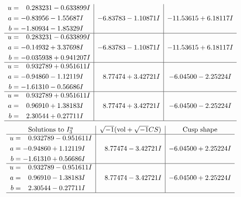 \documentclass[1p]{elsarticle_modified}
\theoremstyle{definition}
\newcommand{\I}{\sqrt{-1}}
\begin{document}
$$\begin{array}{c|c|c}
\begin{aligned}
u &= \phantom{-}0.283231 - 0.633899 I \\
a &= -0.83956 - 1.55687 I \\
b &= -1.80934 - 1.85329 I\end{aligned}
 & -6.83783 - 1.10871 I & -11.53615 + 6.18117 I \\ \hline\begin{aligned}
u &= \phantom{-}0.283231 - 0.633899 I \\
a &= -0.14932 + 3.37698 I \\
b &= -0.035938 + 0.941207 I\end{aligned}
 & -6.83783 - 1.10871 I & -11.53615 + 6.18117 I \\ \hline\begin{aligned}
u &= \phantom{-}0.932789 + 0.951611 I \\
a &= -0.94860 - 1.12119 I \\
b &= -1.61310 - 0.56686 I\end{aligned}
 & \phantom{-}8.77474 + 3.42721 I & -6.04500 - 2.25224 I \\ \hline\begin{aligned}
u &= \phantom{-}0.932789 + 0.951611 I \\
a &= \phantom{-}0.96910 + 1.38183 I \\
b &= \phantom{-}2.30544 + 0.27711 I\end{aligned}
 & \phantom{-}8.77474 + 3.42721 I & -6.04500 - 2.25224 I\\
 \hline 
 \end{array}$$\newpage$$\begin{array}{c|c|c}  
\text{Solutions to }I^u_{3}& \I (\text{vol} + \sqrt{-1}CS) & \text{Cusp shape}\\
 \hline 
\begin{aligned}
u &= \phantom{-}0.932789 - 0.951611 I \\
a &= -0.94860 + 1.12119 I \\
b &= -1.61310 + 0.56686 I\end{aligned}
 & \phantom{-}8.77474 - 3.42721 I & -6.04500 + 2.25224 I \\ \hline\begin{aligned}
u &= \phantom{-}0.932789 - 0.951611 I \\
a &= \phantom{-}0.96910 - 1.38183 I \\
b &= \phantom{-}2.30544 - 0.27711 I\end{aligned}
 & \phantom{-}8.77474 - 3.42721 I & -6.04500 + 2.25224 I\\
 \hline 
 \end{array}$$\newpage
\end{document}
